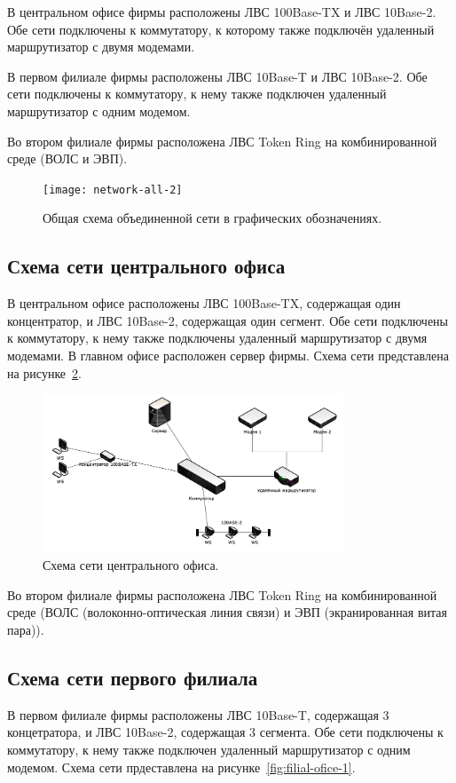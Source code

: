 \documentclass[russian,utf8,emptystyle]{eskdtext}
\begin{document}
В центральном офисе фирмы расположены ЛВС 100Base-TX и ЛВС 10Base-2. Обе сети подключены к коммутатору, к которому также подключён удаленный маршрутизатор с двумя модемами.

В первом филиале фирмы расположены ЛВС 10Base-T и ЛВС 10Base-2. Обе сети подключены к коммутатору, к нему также подключен удаленный маршрутизатор с одним модемом.

Во втором филиале фирмы расположена ЛВС Token Ring на комбинированной среде (ВОЛС и ЭВП).

\begin{figure}[h!]
\centering
\texttt{[image: network-all-2]}
\caption{Общая схема объединенной сети в графических обозначениях.}
\label{fig:network-all-2}
\end{figure}

\clearpage
\subsection{Схема сети центрального офиса}
В центральном офисе расположены ЛВС 100Base-TX, содержащая один концентратор, и ЛВС 10Base-2, содержащая один сегмент. Обе сети подключены к коммутатору, к нему также подключены удаленный маршрутизатор с двумя модемами. В главном офисе расположен сервер фирмы. Схема сети представлена на рисунке~\ref{fig:main-ofice}.

\begin{figure}[h!]
\centering
\includegraphics[width=0.8\textwidth]{main_ofice}
\caption{Схема сети центрального офиса.}
\label{fig:main-ofice}
\end{figure}
Во втором филиале фирмы расположена ЛВС Token Ring на комбинированной среде (ВОЛС (волоконно-оптическая линия связи) и ЭВП (экранированная витая пара)). 
\clearpage
\subsection{Схема сети первого филиала}
В первом филиале фирмы расположены ЛВС 10Base-T, содержащая 3 концетратора, и ЛВС 10Base-2, содержащая 3 сегмента. Обе сети подключены к коммутатору, к нему также подключен удаленный маршрутизатор с одним модемом. Схема сети прдеставлена на рисунке~\ref{fig:filial-ofice-1}.
\end{document}
